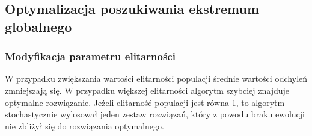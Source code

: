 \documentclass{article}
\begin{document}
    
    \subsection{Optymalizacja poszukiwania ekstremum globalnego}

\subsubsection{Modyfikacja parametru elitarności}

W przypadku zwiększania wartości elitarności populacji średnie wartości odchyleń zmniejszają się. W przypadku większej elitarności algorytm szybciej znajduje optymalne rozwiązanie. Jeżeli elitarność populacji jest równa 1, to algorytm stochastycznie wylosował jeden zestaw rozwiązań, który z powodu braku ewolucji nie zbliżył się do rozwiązania optymalnego.
\end{document}
